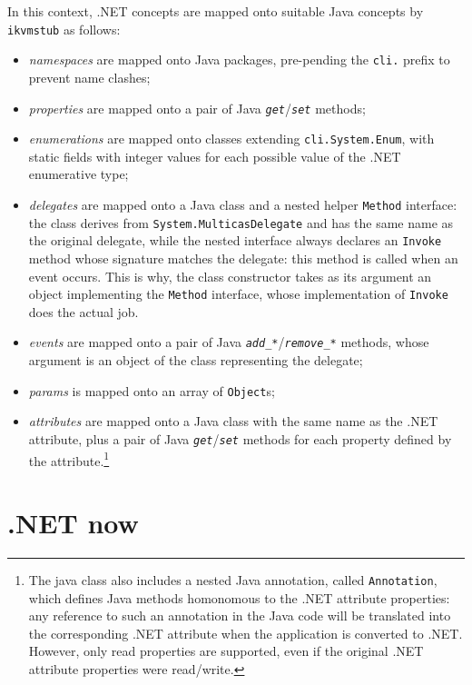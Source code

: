 In this context, .NET concepts are mapped onto suitable Java concepts by \texttt{ikvmstub} as follows:
\begin{itemize}
  \item \textit{namespaces} are mapped onto Java packages, pre-pending the \texttt{cli.} prefix to prevent name clashes;
  \item \textit{properties} are mapped onto a pair of Java \texttt{\textit{get}}/\texttt{\textit{set}} methods;
  \item \textit{enumerations} are mapped onto classes extending \texttt{cli.System.Enum}, with static fields with integer values for each possible value of the .NET enumerative type;
  \item \textit{delegates} are mapped onto a Java class and a nested helper \texttt{Method} interface: the class derives from \texttt{System.MulticasDelegate} and has the same name as the original delegate, while the nested interface always declares an \texttt{Invoke} method whose signature matches the delegate: this method is called when an event occurs. This is why, the class constructor takes as its argument an object implementing the \texttt{Method} interface, whose implementation of \texttt{Invoke} does the actual job.
  \item \textit{events} are mapped onto a pair of Java \texttt{\textit{add\_*}}/\texttt{\textit{remove\_*}} methods, whose argument is an object of the class representing the delegate;
  \item \textit{params} is mapped onto an array of \texttt{Object}s;
  \item \textit{attributes} are mapped onto a Java class with the same name as the .NET attribute, plus a pair of Java \texttt{\textit{get}}/\texttt{\textit{set}} methods for each property defined by the attribute.\footnote{The java class also includes a nested Java annotation, called \texttt{Annotation}, which defines Java methods homonomous to the .NET attribute properties: any reference to such an annotation in the Java code will be translated into the corresponding .NET attribute when the application is converted to .NET. However, only read properties are supported, even if the original .NET attribute properties were read/write.}
\end{itemize}

\section{\tuprolog.NET now}
\label{sec:dotnet-tuprolog-now}

